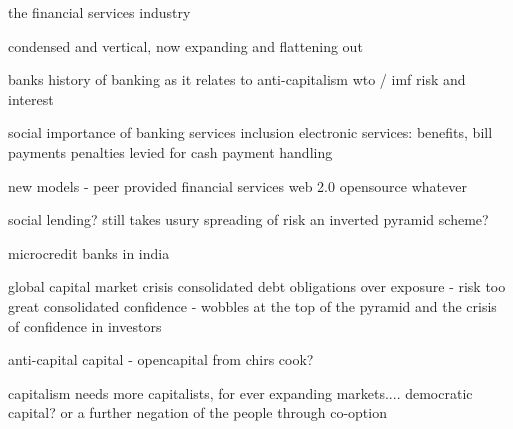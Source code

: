 the financial services industry

condensed and vertical, now expanding and flattening out

banks
	history of banking as it relates to anti-capitalism
	wto / imf
	risk and interest

social importance of banking services
	inclusion
	electronic services: benefits, bill payments
	penalties levied for cash payment handling

new models - peer provided financial services
	web 2.0 opensource whatever

social lending?
	still takes usury 
	spreading of risk
	an inverted pyramid scheme?

microcredit banks in india

global capital market crisis
	consolidated debt obligations
	over exposure - risk too great
	consolidated confidence - wobbles at the top of the pyramid and the crisis of confidence in investors

anti-capital capital - opencapital from chirs cook?

capitalism needs more capitalists, for ever expanding markets....
democratic capital? or a further negation of the people through co-option